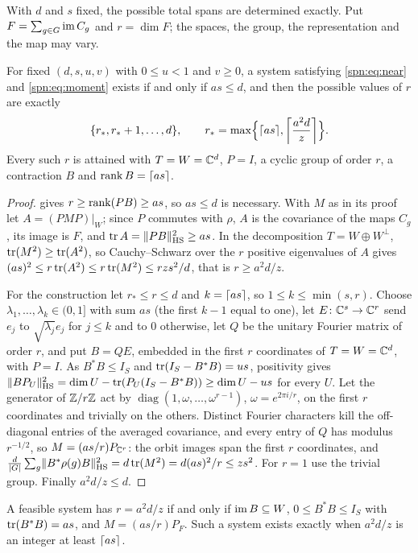 With $d$ and $s$ fixed, the possible total spans are determined exactly. Put
$F=\sum_{g\in G}\spnim C_g$ and $r=\dim F$; the spaces, the group, the representation and the map
may vary.

\begin{theorem}\label{spn:thm:rank-spectrum}
For fixed $(d,s,u,v)$ with $0\le u<1$ and $v\ge0$, a system satisfying \eqref{spn:eq:near} and
\eqref{spn:eq:moment} exists if and only if $as\le d$, and then the possible values of $r$ are exactly
\[
 \set{r_*,r_*+1,\dots,d},\qquad r_*=\max\Bigl\{\ceil{as},\ceil*{\frac{a^2d}z}\Bigr\}.
\]
Every such $r$ is attained with $T=W=\C^d$, $P=I$, a cyclic group of order $r$, a contraction $B$
and $\rank B=\ceil{as}$.
\end{theorem}

\begin{proof}
 gives $r\ge\rank(PB)\ge as$, so $as\le d$ is necessary. With $M$ as in its proof
let $A=(PMP)|_W$; since $P$ commutes with $\rho$, $A$ is the covariance of the maps $C_g$, its image
is $F$, and $\tr A=\norm{PB}_{\spnHS}^2\ge as$. In the decomposition $T=W\oplus W^\perp$,
$\tr(M^2)\ge\tr(A^2)$, so Cauchy--Schwarz over the $r$ positive eigenvalues of $A$ gives
$(as)^2\le r\tr(A^2)\le r\tr(M^2)\le rzs^2/d$, that is $r\ge a^2d/z$.

For the construction let $r_*\le r\le d$ and $k=\ceil{as}$, so $1\le k\le\min(s,r)$. Choose
$\lambda_1,\dots,\lambda_k\in(0,1]$ with sum $as$ (the first $k-1$ equal to one), let
$E\colon\C^s\to\C^r$ send $e_j$ to $\sqrt{\lambda_j}e_j$ for $j\le k$ and to $0$ otherwise, let $Q$ be
the unitary Fourier matrix of order $r$, and put $B=QE$, embedded in the first $r$ coordinates of
$T=W=\C^d$, with $P=I$. As $B^*B\le I_S$ and $\tr(I_S-B^*B)=us$, positivity gives
$\norm{BP_U}_{\spnHS}^2=\dim U-\tr(P_U(I_S-B^*B))\ge\dim U-us$ for every $U$. Let the generator of
$\Z/r\Z$ act by $\operatorname{diag}(1,\omega,\dots,\omega^{r-1})$, $\omega=e^{2\pi i/r}$, on the first $r$
coordinates and trivially on the others. Distinct Fourier characters kill the off-diagonal entries
of the averaged covariance, and every entry of $Q$ has modulus $r^{-1/2}$, so $M=(as/r)P_{\C^r}$: the
orbit images span the first $r$ coordinates, and
$\frac d{\abs G}\sum_g\norm{B^*\rho(g)B}_{\spnHS}^2=d\tr(M^2)=d(as)^2/r\le zs^2$. For $r=1$ use the
trivial group. Finally $a^2d/z\le d$.
\end{proof}

\begin{proposition}\label{spn:prop:rank-equality}
A feasible system has $r=a^2d/z$ if and only if $\spnim B\subseteq W$, $0\le B^*B\le I_S$ with
$\tr(B^*B)=as$, and $M=(as/r)P_F$. Such a system exists exactly when $a^2d/z$ is an integer at least
$\ceil{as}$.
\end{proposition}

